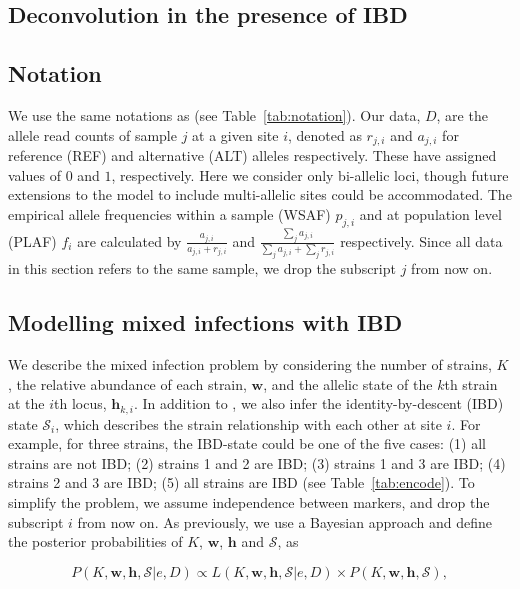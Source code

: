 \documentclass[9pt,lineno]{elife}
\begin{document}
\begin{appendixbox}
\section{Deconvolution in the presence of IBD}
\subsection{Notation}
We use the same notations as \citet{Zhu2017} (see Table~\ref{tab:notation}). Our data, $D$, are the allele read counts of sample $j$ at a given site $i$, denoted as $r_{j,i}$ and $a_{j,i}$ for reference (REF) and alternative (ALT) alleles respectively.  These have assigned values of $0$ and $1$, respectively. Here we consider only bi-allelic loci, though future extensions to the model to include multi-allelic sites could be accommodated.  The empirical allele frequencies within a sample (WSAF) $p_{j,i}$ and at population level (PLAF) $f_i$ are calculated by $ \frac{a_{j,i}}{a_{j,i} + r_{j,i}}$ and $ \frac{\sum_j a_{j,i}}{\sum_j a_{j,i} + \sum_j r_{j,i}}$ respectively. Since all data in this section refers to the same sample, we drop the subscript $j$ from now on.



\subsection{Modelling mixed infections with IBD} \label{sect:prior}
We describe the mixed infection problem by considering the number of strains, $K$, the relative abundance of each strain, $\mathbf{w}$, and the allelic state of the $k$th strain at the $i$th locus, $\mathbf{h}_{k,i}$. In addition to \citet{Zhu2017}, we also infer the identity-by-descent (IBD) state $\mathcal{S}_{i}$, which describes the strain relationship with each other at site $i$. For example, for three strains, the IBD-state could be one of the five cases: (1) all strains are not IBD; (2) strains 1 and 2 are IBD; (3) strains 1 and 3 are IBD; (4) strains 2 and 3 are IBD; (5) all strains are IBD (see Table~\ref{tab:encode}). To simplify the problem, we assume independence between markers, and drop the subscript $i$ from now on. As previously, we use a Bayesian approach and define the posterior probabilities of $K$, $\mathbf{w}$, $\mathbf{h}$ and $\mathcal{S}$,  as

\begin{equation}
P(K, \mathbf{w}, \mathbf{h}, \mathcal{S}| e, D) \propto L(K, \mathbf{w}, \mathbf{h}, \mathcal{S} | e, D) \times P(K, \mathbf{w}, \mathbf{h}, \mathcal{S}), \label{eqn:post}
\end{equation}



\end{appendixbox}
\end{document}
